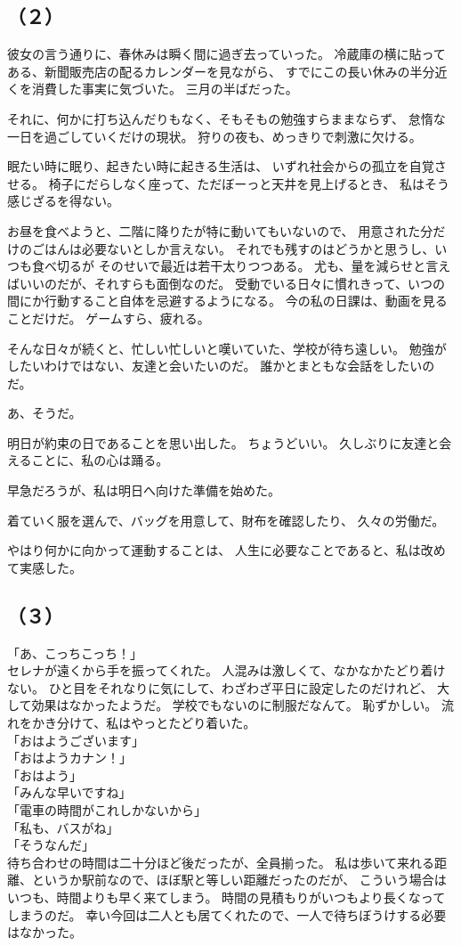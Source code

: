 \documentclass[../IHMain]{subfiles}
\begin{document}
\subsection*{（２）}
彼女の言う通りに、春休みは瞬く間に過ぎ去っていった。
冷蔵庫の横に貼ってある、新聞販売店の配るカレンダーを見ながら、
すでにこの長い休みの半分近くを消費した事実に気づいた。
三月の半ばだった。

それに、何かに打ち込んだりもなく、そもそもの勉強すらままならず、
怠惰な一日を過ごしていくだけの現状。
狩りの夜も、めっきりで刺激に欠ける。

眠たい時に眠り、起きたい時に起きる生活は、
いずれ社会からの孤立を自覚させる。
椅子にだらしなく座って、ただぼーっと天井を見上げるとき、
私はそう感じざるを得ない。

お昼を食べようと、二階に降りたが特に動いてもいないので、
用意された分だけのごはんは必要ないとしか言えない。
それでも残すのはどうかと思うし、いつも食べ切るが
そのせいで最近は若干太りつつある。
尤も、量を減らせと言えばいいのだが、それすらも面倒なのだ。
受動でいる日々に慣れきって、いつの間にか行動すること自体を忌避するようになる。
今の私の日課は、動画を見ることだけだ。
ゲームすら、疲れる。

そんな日々が続くと、忙しい忙しいと嘆いていた、学校が待ち遠しい。
勉強がしたいわけではない、友達と会いたいのだ。
誰かとまともな会話をしたいのだ。

あ、そうだ。

明日が約束の日であることを思い出した。
ちょうどいい。
久しぶりに友達と会えることに、私の心は踊る。

早急だろうが、私は明日へ向けた準備を始めた。

着ていく服を選んで、バッグを用意して、財布を確認したり、
久々の労働だ。

やはり何かに向かって運動することは、
人生に必要なことであると、私は改めて実感した。

\subsection*{（３）}
「あ、こっちこっち！」\\
セレナが遠くから手を振ってくれた。
人混みは激しくて、なかなかたどり着けない。
ひと目をそれなりに気にして、わざわざ平日に設定したのだけれど、
大して効果はなかったようだ。
学校でもないのに制服だなんて。
恥ずかしい。
流れをかき分けて、私はやっとたどり着いた。\\
「おはようございます」\\
「おはようカナン！」\\
「おはよう」\\
「みんな早いですね」\\
「電車の時間がこれしかないから」\\
「私も、バスがね」\\
「そうなんだ」\\
待ち合わせの時間は二十分ほど後だったが、全員揃った。
私は歩いて来れる距離、というか駅前なので、ほぼ駅と等しい距離だったのだが、
こういう場合はいつも、時間よりも早く来てしまう。
時間の見積もりがいつもより長くなってしまうのだ。
幸い今回は二人とも居てくれたので、一人で待ちぼうけする必要はなかった。
\end{document}
